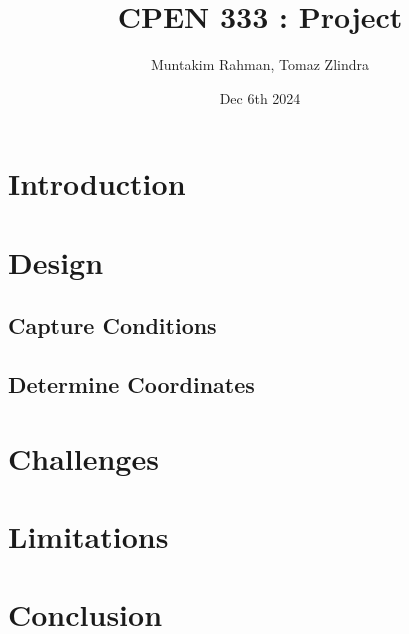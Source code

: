 \documentclass{article}
\title{CPEN 333 : Project}
\author{Muntakim Rahman, Tomaz Zlindra}
\date{Dec 6th 2024}
\begin{document}
\maketitle

\section{Introduction}

\section{Design}

\subsection{Capture Conditions}
\subsection{Determine Coordinates}

\section{Challenges}
\section{Limitations}

\section{Conclusion}
\end{document}
